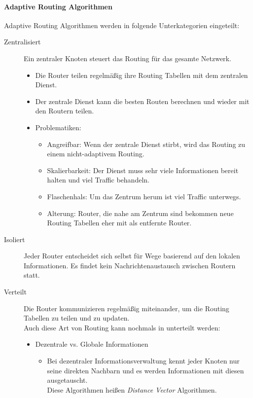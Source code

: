 \documentclass[a4paper, 11pt, accentcolor = tud3b]{tudreport}
\begin{document}
            \paragraph{Adaptive Routing Algorithmen}
	            Adaptive Routing Algorithmen werden in folgende Unterkategorien eingeteilt:
	            \begin{description}
	            	\item[Zentralisiert] Ein zentraler Knoten steuert das Routing für das gesamte Netzwerk.
		            	\begin{itemize}
		            		\item Die Router teilen regelmäßig ihre Routing Tabellen mit dem zentralen Dienst.
		            		\item Der zentrale Dienst kann die besten Routen berechnen und wieder mit den Routern teilen.
		            		\item Problematiken:
		            		\begin{itemize}
		            			\item Angreifbar: Wenn der zentrale Dienst stirbt, wird das Routing zu einem nicht-adaptivem Routing.
		            			\item Skalierbarkeit: Der Dienst muss sehr viele Informationen bereit halten und viel Traffic behandeln.
		            			\item Flaschenhals: Um das Zentrum herum ist viel Traffic unterwegs.
		            			\item Alterung: Router, die nahe am Zentrum sind bekommen neue Routing Tabellen eher mit als entfernte Router.
		            		\end{itemize}
		            	\end{itemize}
	            	\item[Isoliert] Jeder Router entscheidet sich selbst für Wege basierend auf den lokalen Informationen. Es findet kein Nachrichtenaustausch zwischen Routern statt.
	            	\item[Verteilt] Die Router kommunizieren regelmäßig miteinander, um die Routing Tabellen zu teilen und zu updaten. \\ Auch diese Art von Routing kann nochmals in unterteilt werden:
		            	\begin{itemize}
		            		\item Dezentrale vs. Globale Informationen
			            		\begin{itemize}
			            			\item Bei dezentraler Informationsverwaltung kennt jeder Knoten nur seine direkten Nachbarn und es werden Informationen mit diesen ausgetauscht. \\ Diese Algorithmen heißen \textit{Distance Vector} Algorithmen.

\end{itemize}
\end{itemize}
\end{description}
\end{document}
